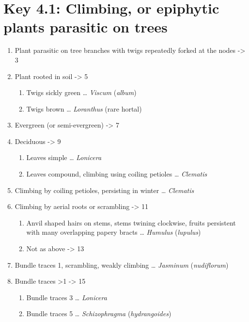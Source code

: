 \documentclass[openany]{book}
\providecommand{\tightlist}{%
  \setlength{\itemsep}{0pt}\setlength{\parskip}{0pt}}
\begin{document}
\hypertarget{key-4.1-climbing-or-epiphytic-plants-parasitic-on-trees}{%
\section{Key 4.1: Climbing, or epiphytic plants parasitic on
trees}\label{key-4.1-climbing-or-epiphytic-plants-parasitic-on-trees}}

\begin{enumerate}
\def\labelenumi{\arabic{enumi}.}
\tightlist
\item
  Plant parasitic on tree branches with twigs repeatedly forked at the
  nodes -\textgreater{} 3
\item
  Plant rooted in soil -\textgreater{} 5

  \begin{enumerate}
  \def\labelenumii{\arabic{enumii}.}
  \setcounter{enumii}{2}
  \tightlist
  \item
    Twigs sickly green \ldots{} \emph{Viscum} (\emph{album})
  \item
    Twigs brown \ldots{} \emph{Loranthus} (rare hortal)
  \end{enumerate}
\item
  Evergreen (or semi-evergreen) -\textgreater{} 7
\item
  Deciduous -\textgreater{} 9

  \begin{enumerate}
  \def\labelenumii{\arabic{enumii}.}
  \setcounter{enumii}{6}
  \tightlist
  \item
    Leaves simple \ldots{} \emph{Lonicera}
  \item
    Leaves compound, climbing using coiling petioles \ldots{}
    \emph{Clematis}
  \end{enumerate}
\item
  Climbing by coiling petioles, persisting in winter \ldots{}
  \emph{Clematis}
\item
  Climbing by aerial roots or scrambling -\textgreater{} 11

  \begin{enumerate}
  \def\labelenumii{\arabic{enumii}.}
  \setcounter{enumii}{10}
  \tightlist
  \item
    Anvil shaped hairs on stems, stems twining clockwise, fruits
    persistent with many overlapping papery bracts \ldots{}
    \emph{Humulus} (\emph{lupulus})
  \item
    Not as above -\textgreater{} 13
  \end{enumerate}
\item
  Bundle traces 1, scrambling, weakly climbing \ldots{} \emph{Jasminum}
  (\emph{nudiflorum})
\item
  Bundle traces \textgreater{}1 -\textgreater{} 15

  \begin{enumerate}
  \def\labelenumii{\arabic{enumii}.}
  \setcounter{enumii}{14}
  \tightlist
  \item
    Bundle traces 3 \ldots{} \emph{Lonicera}
  \item
    Bundle traces 5 \ldots{} \emph{Schizophragma} (\emph{hydrangoides})
  \end{enumerate}
\end{enumerate}
\end{document}
